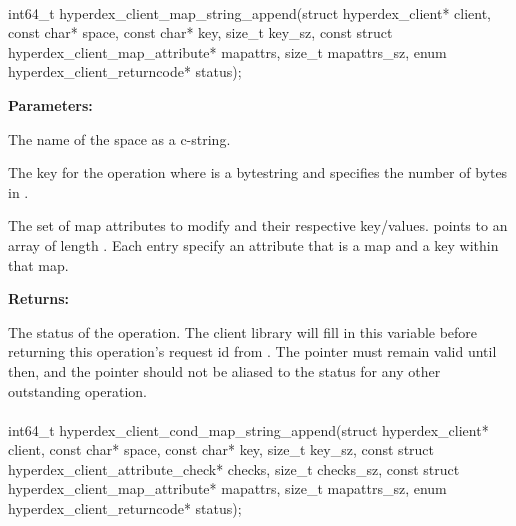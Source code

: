 \paragraph{}
\begin{ccode}
int64_t hyperdex_client_map_string_append(struct hyperdex_client* client,
                const char* space,
                const char* key, size_t key_sz,
                const struct hyperdex_client_map_attribute* mapattrs, size_t mapattrs_sz,
                enum hyperdex_client_returncode* status);
\end{ccode}
\funcdesc 

\noindent\textbf{Parameters:}
\begin{description}[labelindent=\widthof{{\code{mapattrs}, \code{mapattrs\_sz}}},leftmargin=*,noitemsep,nolistsep,align=right]
\item[\code{space}] The name of the space as a c-string.
\item[\code{key}, \code{key\_sz}] The key for the operation where  is a bytestring and  specifies the number of bytes in .
\item[\code{mapattrs}, \code{mapattrs\_sz}] The set of map attributes to modify and their respective key/values.   points to an array of length .  Each entry specify an attribute that is a map and a key within that map.
\end{description}

\noindent\textbf{Returns:}
\begin{description}[labelindent=\widthof{{\code{status}}},leftmargin=*,noitemsep,nolistsep,align=right]
\item[\code{status}] The status of the operation.  The client library will fill in this variable before returning this operation's request id from .  The pointer must remain valid until then, and the pointer should not be aliased to the status for any other outstanding operation.
\end{description}

\paragraph{}
\begin{ccode}
int64_t hyperdex_client_cond_map_string_append(struct hyperdex_client* client,
                const char* space,
                const char* key, size_t key_sz,
                const struct hyperdex_client_attribute_check* checks, size_t checks_sz,
                const struct hyperdex_client_map_attribute* mapattrs, size_t mapattrs_sz,
                enum hyperdex_client_returncode* status);
\end{ccode}
\funcdesc 

